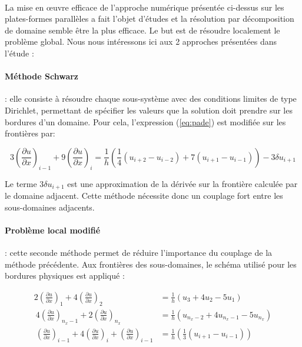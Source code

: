 \paragraph{}La mise en œuvre efficace de l'approche numérique présentée ci-dessus sur les plates-formes parallèles a fait l'objet d'études \cite{Stoessel:1994:DNS:199617.199626,Hirsch:1988:NCI:63653} et la résolution par décomposition de domaine semble être la plus efficace. Le but est de résoudre localement le problème global. Nous nous intéressons ici aux 2 approches présentées dans l'étude \cite{Baum98dnsof}:

\paragraph{Méthode Schwarz}: elle consiste à résoudre chaque sous-système avec des conditions limites de type Dirichlet, permettant de spécifier les valeurs que la solution doit prendre sur les bordures d'un domaine. Pour cela, l'expression (\ref{eq:pade}) est modifiée sur les frontières par:

\begin{equation}\label{eq:dirichlet}
3\left( \frac{\partial u}{\partial x}\right) _{i-1} + 9\left( \frac{\partial u}{\partial x}\right) _{i}  = \frac{1}{h}\left(  \frac{1}{4} \left( u_{i+2}-u_{i-2} \right) + 7 \left( u_{i+1} - u_{i-1} \right) \right) - 3 \delta u_{i+1}
\end{equation}

Le terme $3 \delta u_{i+1}$ est une approximation de la dérivée sur la frontière calculée par le domaine adjacent. Cette méthode nécessite donc un couplage fort entre les sous-domaines adjacents.

\paragraph{Problème local modifié}: cette seconde méthode permet de réduire l'importance du couplage de la méthode précédente. Aux frontières des sous-domaines, le schéma utilisé pour les bordures physiques est appliqué \cite{Stoessel:1994:DNS:199617.199626}:

  \begin{subequations}
    \begin{align}
      2 \left( \frac{\partial u}{\partial x}\right) _{1} + 4 \left( \frac{\partial u}{\partial x}\right) _{2} &= \frac{1}{h}\left( u_3 + 4u_2 - 5u_1 \right)\label{eq:schem1}
      \\
~
      4\left( \frac{\partial u}{\partial x}\right) _{n_x-1} + 2\left( \frac{\partial u}{\partial x}\right) _{n_x}  &= \frac{1}{h} \left( u_{n_x-2} + 4 u_{n_x-1} - 5 u_{n_x} \right)\label{eq:schemnx}
    \\
~
    \left( \frac{\partial u}{\partial x}\right) _{i-1} + 4 \left( \frac{\partial u}{\partial x}\right) _{i}  +  \left( \frac{\partial u}{\partial x}\right) _{i-1} &= \frac{1}{h}\left( \frac{1}{3} \left( u_{i+1} - u_{i-1} \right) \right)\label{eq:schem-2nx-1}
    \end{align}
  \end{subequations}

